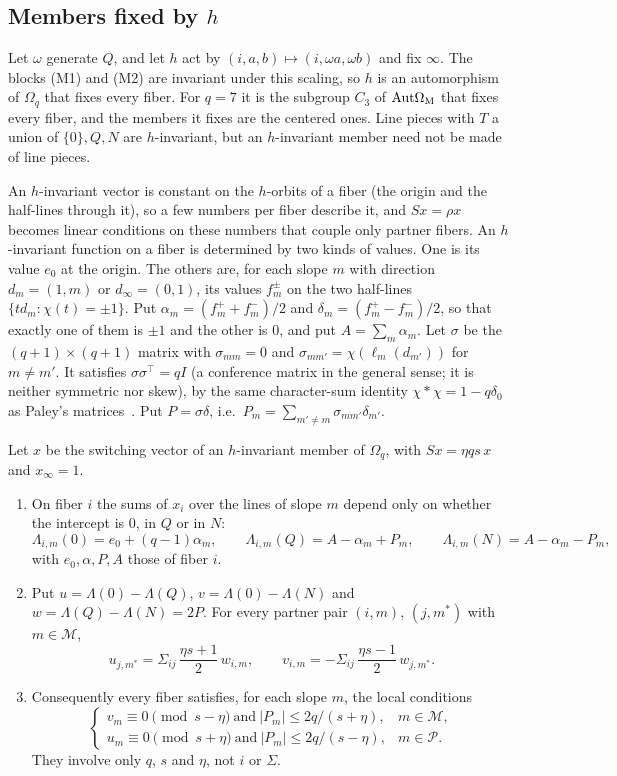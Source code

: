 \subsection{Members fixed by \texorpdfstring{$h$}{h}}
Let $\omega$ generate $Q$, and let $h$ act by $(i,a,b)\mapsto(i,\omega a,\omega b)$ and fix $\infty$.
The blocks (M1) and (M2) are invariant under this scaling, so $h$ is an automorphism of $\Omega_q$ that fixes every fiber.
For $q=7$ it is the subgroup $C_3$ of $\mathrm{Aut}\Omega_{\mathrm M}$ that fixes every fiber, and the members it fixes are the centered ones.
Line pieces with $T$ a union of $\{0\},Q,N$ are $h$-invariant, but an $h$-invariant member need not be made of line pieces.

An $h$-invariant vector is constant on the $h$-orbits of a fiber (the origin and the half-lines through it), so a few
numbers per fiber describe it, and $Sx=\rho x$ becomes linear conditions on these numbers that couple only partner
fibers. An $h$-invariant function on a fiber is determined by two kinds of values.
One is its value $e_0$ at the origin.
The others are, for each slope $m$ with direction $d_m=(1,m)$ or $d_\infty=(0,1)$, its values $f_m^\pm$ on the two half-lines $\{td_m:\chi(t)=\pm1\}$.
Put $\alpha_m=(f_m^++f_m^-)/2$ and $\delta_m=(f_m^+-f_m^-)/2$, so that exactly one of them is $\pm1$ and the other is $0$, and put $A=\sum_m\alpha_m$.
Let $\sigma$ be the $(q+1)\times(q+1)$ matrix with $\sigma_{mm}=0$ and $\sigma_{mm'}=\chi(\ell_m(d_{m'}))$ for $m\ne m'$.
It satisfies $\sigma\sigma^\top=qI$ (a conference matrix in the general sense; it is neither symmetric nor skew), by the same character-sum identity $\chi*\chi=1-q\delta_0$ as Paley's matrices~\cite{Paley1933}.
Put $P=\sigma\delta$, i.e.\ $P_m=\sum_{m'\ne m}\sigma_{mm'}\delta_{m'}$.

\begin{proposition}\label{prop:hinv}
Let $x$ be the switching vector of an $h$-invariant member of $\Omega_q$, with $Sx=\eta qs\,x$ and $x_\infty=1$.
\begin{enumerate}
\item On fiber $i$ the sums of $x_i$ over the lines of slope $m$ depend only on whether the intercept is $0$, in $Q$ or in $N$:
\[
\Lambda_{i,m}(0)=e_0+(q-1)\alpha_m,\qquad \Lambda_{i,m}(Q)=A-\alpha_m+P_m,\qquad \Lambda_{i,m}(N)=A-\alpha_m-P_m,
\]
with $e_0,\alpha,P,A$ those of fiber $i$.
\item Put $u=\Lambda(0)-\Lambda(Q)$, $v=\Lambda(0)-\Lambda(N)$ and $w=\Lambda(Q)-\Lambda(N)=2P$. For every partner
pair $(i,m)$, $(j,m^*)$ with $m\in\mathcal M$,
\[
u_{j,m^*}=\Sigma_{ij}\,\frac{\eta s+1}2\,w_{i,m},\qquad v_{i,m}=-\Sigma_{ij}\,\frac{\eta s-1}2\,w_{j,m^*}.
\]
\item Consequently every fiber satisfies, for each slope $m$, the local conditions
\[
\begin{cases}
v_m\equiv0\pmod{s-\eta}\ \text{and}\ |P_m|\le 2q/(s+\eta), & m\in\mathcal M,\\
u_m\equiv0\pmod{s+\eta}\ \text{and}\ |P_m|\le 2q/(s-\eta), & m\in\mathcal P.
\end{cases}
\]
They involve only $q$, $s$ and $\eta$, not $i$ or $\Sigma$.
\end{enumerate}
\end{proposition}

